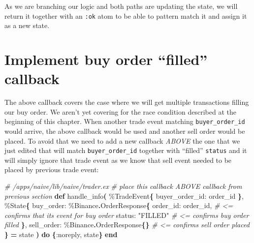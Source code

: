 \documentclass[
  oneside]{book}
\newenvironment{Shaded}{\begin{snugshade}}{\end{snugshade}}
\newcommand{\CommentTok}[1]{\textcolor[rgb]{0.56,0.35,0.01}{\textit{#1}}}
\newcommand{\ConstantTok}[1]{\textcolor[rgb]{0.56,0.35,0.01}{#1}}
\newcommand{\FunctionTok}[1]{\textcolor[rgb]{0.13,0.29,0.53}{\textbf{#1}}}
\newcommand{\KeywordTok}[1]{\textcolor[rgb]{0.13,0.29,0.53}{\textbf{#1}}}
\newcommand{\NormalTok}[1]{#1}
\newcommand{\OperatorTok}[1]{\textcolor[rgb]{0.81,0.36,0.00}{\textbf{#1}}}
\newcommand{\StringTok}[1]{\textcolor[rgb]{0.31,0.60,0.02}{#1}}
\newcommand{\VariableTok}[1]{\textcolor[rgb]{0.00,0.00,0.00}{#1}}
\begin{document}
As we are branching our logic and both paths are updating the state, we will return it together with an \texttt{:ok} atom to be able to pattern match it and assign it as a new state.

\section{Implement buy order ``filled'' callback}\label{implement-buy-order-filled-callback}

The above callback covers the case where we will get multiple transactions filling our buy order. We aren't yet covering for the race condition described at the beginning of this chapter. When another trade event matching \texttt{buyer\_order\_id} would arrive, the above callback would be used and another sell order would be placed. To avoid that we need to add a new callback \emph{ABOVE} the one that we just edited that will match \texttt{buyer\_order\_id} together with ``filled'' \texttt{status} and it will simply ignore that trade event as we know that sell event needed to be placed by previous trade event:

\begin{Shaded}
\begin{Highlighting}[]
  \CommentTok{\# /apps/naive/lib/naive/trader.ex}
  \CommentTok{\# place this callback ABOVE callback from previous section}
  \KeywordTok{def}\NormalTok{ handle\_info}\FunctionTok{(}
\NormalTok{        \%}\ConstantTok{TradeEvent}\FunctionTok{\{}
          \VariableTok{buyer\_order\_id:}\NormalTok{ order\_id}
        \FunctionTok{\}}\NormalTok{,}
\NormalTok{        \%}\ConstantTok{State}\FunctionTok{\{}
          \VariableTok{buy\_order:}\NormalTok{ \%}\ConstantTok{Binance}\OperatorTok{.}\ConstantTok{OrderResponse}\FunctionTok{\{}
            \VariableTok{order\_id:}\NormalTok{ order\_id, }\CommentTok{\# \textless{}= confirms that it\textquotesingle{}s event for buy order}
            \VariableTok{status:} \StringTok{"FILLED"} \CommentTok{\# \textless{}= confirms buy order filled}
          \FunctionTok{\}}\NormalTok{,}
          \VariableTok{sell\_order:}\NormalTok{ \%}\ConstantTok{Binance}\OperatorTok{.}\ConstantTok{OrderResponse}\FunctionTok{\{\}} \CommentTok{\# \textless{}= confirms sell order placed}
        \FunctionTok{\}} \OperatorTok{=}\NormalTok{ state}
      \FunctionTok{)} \KeywordTok{do}
    \FunctionTok{\{}\VariableTok{:noreply}\NormalTok{, state}\FunctionTok{\}}
  \KeywordTok{end}
\end{Highlighting}
\end{Shaded}
\end{document}
